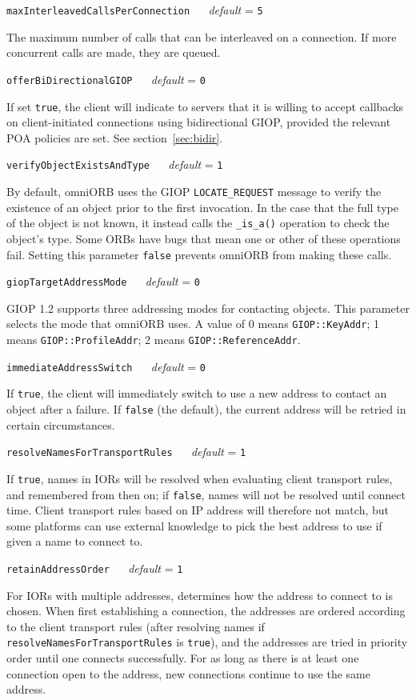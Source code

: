 \documentclass[11pt,oneside,a4paper]{book}
\makeatletter
\newcommand{\code}[1]{\texttt{#1}}
\newcommand{\op}[1]{\texttt{#1()}}
\newcommand{\confopt}[2]
  {\vspace{\baselineskip}\par\noindent\code{#1} ~~ \textit{default} =
   \code{#2}}
\renewcommand{\confopt}[2]
  {\vspace{\baselineskip}\par\noindent\code{#1} ~~ \textit{default} =
   \code{#2}\\[-1ex]\@afterheading}
\newcommand{\dsc}{\discretionary{}{}{}}
\makeatother
\begin{document}
\confopt{maxInterleavedCallsPerConnection}{5}

The maximum number of calls that can be interleaved on a connection.
If more concurrent calls are made, they are queued.


\confopt{offerBiDirectionalGIOP}{0}

If set \code{true}, the client will indicate to servers that it is
willing to accept callbacks on client-initiated connections using
bidirectional GIOP, provided the relevant POA policies are set. See
section~\ref{sec:bidir}.


\confopt{verifyObjectExistsAndType}{1}

By default, omniORB uses the GIOP \code{LOCATE\_REQUEST} message to
verify the existence of an object prior to the first invocation. In
the case that the full type of the object is not known, it instead
calls the \op{\_is\_a} operation to check the object's type. Some ORBs
have bugs that mean one or other of these operations fail. Setting
this parameter \code{false} prevents omniORB from making these calls.


\confopt{giopTargetAddressMode}{0}

GIOP 1.2 supports three addressing modes for contacting objects. This
parameter selects the mode that omniORB uses. A value of 0 means
\code{GIOP::KeyAddr}; 1 means \code{GIOP::ProfileAddr}; 2 means
\code{GIOP::ReferenceAddr}.


\confopt{immediateAddressSwitch}{0}

If \code{true}, the client will immediately switch to use a new
address to contact an object after a failure. If \code{false} (the
default), the current address will be retried in certain
circumstances.

\confopt{resolveNamesForTransportRules}{1}

If \code{true}, names in IORs will be resolved when evaluating client
transport rules, and remembered from then on; if \code{false}, names
will not be resolved until connect time. Client transport rules based
on IP address will therefore not match, but some platforms can use
external knowledge to pick the best address to use if given a name to
connect to.

\confopt{retainAddressOrder}{1}

For IORs with multiple addresses, determines how the address to
connect to is chosen. When first establishing a connection, the
addresses are ordered according to the client transport rules (after
resolving names if \code{resolveNamesFor\dsc{}TransportRules} is
\code{true}), and the addresses are tried in priority order until one
connects successfully. For as long as there is at least one connection
open to the address, new connections continue to use the same address.
\end{document}
